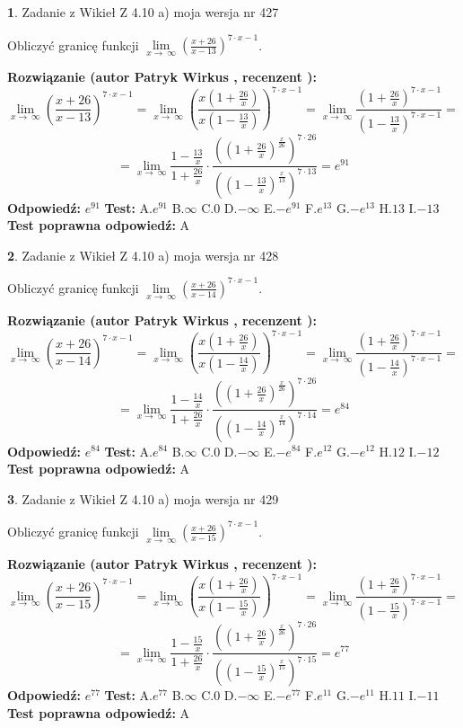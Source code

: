 \documentclass[12pt, a4paper]{article}
\theoremstyle{definition} %
\newtheorem{zad}{}
\newcommand{\zadStart}[1]{\begin{zad}#1\newline}
\newcommand{\zadStop}{\end{zad}}
\newcommand{\rozwStart}[2]{\noindent \textbf{Rozwiązanie (autor #1 , recenzent #2): }\newline}
\newcommand{\rozwStop}{\newline}
\newcommand{\odpStart}{\noindent \textbf{Odpowiedź:}\newline}
\newcommand{\odpStop}{\newline}
\newcommand{\testStart}{\noindent \textbf{Test:}\newline}
\newcommand{\testStop}{\newline}
\newcommand{\kluczStart}{\noindent \textbf{Test poprawna odpowiedź:}\newline}
\newcommand{\kluczStop}{\newline}
\begin{document}
\zadStart{Zadanie z Wikieł Z 4.10 a) moja wersja nr 427}

Obliczyć granicę funkcji  $\lim\limits_{x\to\ \infty}(\frac{x+26}{x-13})^{7\cdot x-1}$.
\zadStop
\rozwStart{Patryk Wirkus}{}
$$\lim\limits_{x\to\ \infty}(\frac{x+26}{x-13})^{7\cdot x-1} = \lim\limits_{x\to\ \infty}(\frac{x(1+\frac{26}{x})}{x(1-\frac{13}{x})})^{7\cdot x-1}=\lim\limits_{x\to\ \infty}\frac{(1+\frac{26}{x})^{7\cdot x-1}}{(1-\frac{13}{x})^{7\cdot x-1}}=$$
$$=\lim\limits_{x\to\ \infty}\frac{1-\frac{13}{x}}{1+\frac{26}{x}}\cdot\frac{((1+\frac{26}{x})^{\frac{x}{26}})^{7\cdot26}}{((1-\frac{13}{x})^{\frac{x}{13}})^{7\cdot13}}=e^{91}$$
\rozwStop
\odpStart
$e^{91}$
\odpStop
\testStart
A.$e^{91}$ B.$\infty$ C.$0$ D.$-\infty$ E.$-e^{91}$
F.$e^{13}$ G.$-e^{13}$
H.$13$
I.$-13$
\testStop
\kluczStart
A
\kluczStop



\zadStart{Zadanie z Wikieł Z 4.10 a) moja wersja nr 428}

Obliczyć granicę funkcji  $\lim\limits_{x\to\ \infty}(\frac{x+26}{x-14})^{7\cdot x-1}$.
\zadStop
\rozwStart{Patryk Wirkus}{}
$$\lim\limits_{x\to\ \infty}(\frac{x+26}{x-14})^{7\cdot x-1} = \lim\limits_{x\to\ \infty}(\frac{x(1+\frac{26}{x})}{x(1-\frac{14}{x})})^{7\cdot x-1}=\lim\limits_{x\to\ \infty}\frac{(1+\frac{26}{x})^{7\cdot x-1}}{(1-\frac{14}{x})^{7\cdot x-1}}=$$
$$=\lim\limits_{x\to\ \infty}\frac{1-\frac{14}{x}}{1+\frac{26}{x}}\cdot\frac{((1+\frac{26}{x})^{\frac{x}{26}})^{7\cdot26}}{((1-\frac{14}{x})^{\frac{x}{14}})^{7\cdot14}}=e^{84}$$
\rozwStop
\odpStart
$e^{84}$
\odpStop
\testStart
A.$e^{84}$ B.$\infty$ C.$0$ D.$-\infty$ E.$-e^{84}$
F.$e^{12}$ G.$-e^{12}$
H.$12$
I.$-12$
\testStop
\kluczStart
A
\kluczStop



\zadStart{Zadanie z Wikieł Z 4.10 a) moja wersja nr 429}

Obliczyć granicę funkcji  $\lim\limits_{x\to\ \infty}(\frac{x+26}{x-15})^{7\cdot x-1}$.
\zadStop
\rozwStart{Patryk Wirkus}{}
$$\lim\limits_{x\to\ \infty}(\frac{x+26}{x-15})^{7\cdot x-1} = \lim\limits_{x\to\ \infty}(\frac{x(1+\frac{26}{x})}{x(1-\frac{15}{x})})^{7\cdot x-1}=\lim\limits_{x\to\ \infty}\frac{(1+\frac{26}{x})^{7\cdot x-1}}{(1-\frac{15}{x})^{7\cdot x-1}}=$$
$$=\lim\limits_{x\to\ \infty}\frac{1-\frac{15}{x}}{1+\frac{26}{x}}\cdot\frac{((1+\frac{26}{x})^{\frac{x}{26}})^{7\cdot26}}{((1-\frac{15}{x})^{\frac{x}{15}})^{7\cdot15}}=e^{77}$$
\rozwStop
\odpStart
$e^{77}$
\odpStop
\testStart
A.$e^{77}$ B.$\infty$ C.$0$ D.$-\infty$ E.$-e^{77}$
F.$e^{11}$ G.$-e^{11}$
H.$11$
I.$-11$
\testStop
\kluczStart
A
\kluczStop
\end{document}
